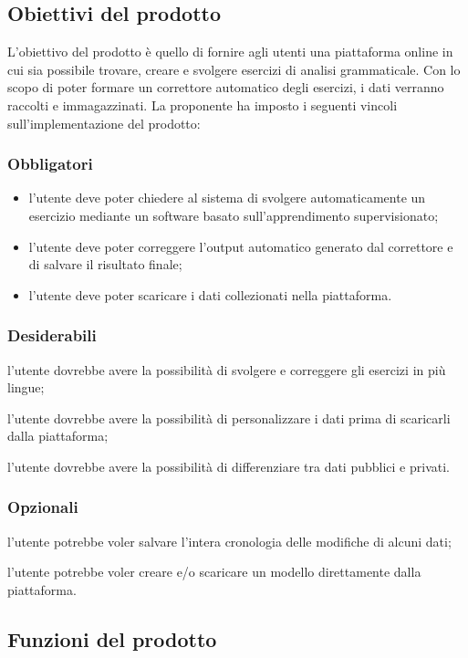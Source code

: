 \subsection{Obiettivi del prodotto}
	L'obiettivo del prodotto è quello di fornire agli utenti una piattaforma online in cui sia possibile trovare, creare e svolgere esercizi di analisi grammaticale. 
Con lo scopo di poter formare un correttore automatico degli esercizi, i dati verranno raccolti e immagazzinati. 
La proponente ha imposto i seguenti vincoli sull'implementazione del prodotto:

\subsubsection{Obbligatori}
\begin{itemize}
	\item l'utente deve poter chiedere al sistema di svolgere automaticamente un esercizio mediante un software basato sull'apprendimento supervisionato;
	\item l'utente deve poter correggere l'output automatico generato dal correttore e di salvare il risultato finale;
	\item l'utente deve poter scaricare i dati collezionati nella piattaforma.
\end{itemize}
\subsubsection{Desiderabili}
	\item l'utente dovrebbe avere la possibilità di svolgere e correggere gli esercizi in più lingue;
	\item l'utente dovrebbe avere la possibilità di personalizzare i dati prima di scaricarli dalla piattaforma;
	\item l'utente dovrebbe avere la possibilità di differenziare tra dati pubblici e privati.
\subsubsection{Opzionali}
	\item l'utente potrebbe voler salvare l'intera cronologia delle modifiche di alcuni dati;
	\item l'utente potrebbe voler creare e/o scaricare un modello direttamente dalla piattaforma.
	
\subsection{Funzioni del prodotto}


